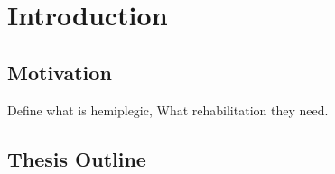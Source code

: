 \chapter{Introduction}
\label{chap:intro}


\section{Motivation}
Define what is hemiplegic, What rehabilitation they need.


\section{Thesis Outline}


